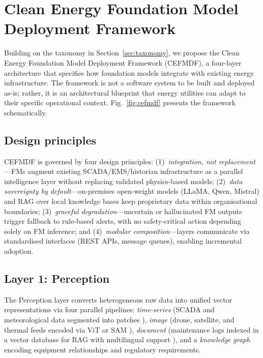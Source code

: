 \documentclass[preprint,12pt]{elsarticle}
\begin{document}
\section{Clean Energy Foundation Model Deployment Framework}
\label{sec:framework}

Building on the taxonomy in Section~\ref{sec:taxonomy}, we propose the Clean Energy Foundation Model Deployment Framework (CEFMDF), a four-layer architecture that specifies how foundation models integrate with existing energy infrastructure. The framework is not a software system to be built and deployed as-is; rather, it is an architectural blueprint that energy utilities can adapt to their specific operational context. Fig.~\ref{fig:cefmdf} presents the framework schematically.

\subsection{Design principles}
\label{subsec:design_principles}

CEFMDF is governed by four design principles: (1)~\textit{integration, not replacement}---FMs augment existing SCADA/EMS/historian infrastructure as a parallel intelligence layer without replacing validated physics-based models; (2)~\textit{data sovereignty by default}---on-premises open-weight models (LLaMA, Qwen, Mistral) and RAG over local knowledge bases keep proprietary data within organisational boundaries; (3)~\textit{graceful degradation}---uncertain or hallucinated FM outputs trigger fallback to rule-based alerts, with no safety-critical action depending solely on FM inference; and (4)~\textit{modular composition}---layers communicate via standardised interfaces (REST APIs, message queues), enabling incremental adoption.

\subsection{Layer 1: Perception}
\label{subsec:perception}

The Perception layer converts heterogeneous raw data into unified vector representations via four parallel pipelines: \textit{time-series} (SCADA and meteorological data segmented into patches \cite{nie2023patchtst}), \textit{image} (drone, satellite, and thermal feeds encoded via ViT \cite{dosovitskiy2021vit} or SAM \cite{kirillov2023sam}), \textit{document} (maintenance logs indexed in a vector database for RAG with multilingual support \cite{bai2023qwen, zeng2023glm130b}), and a \textit{knowledge graph} encoding equipment relationships and regulatory requirements.
\end{document}
